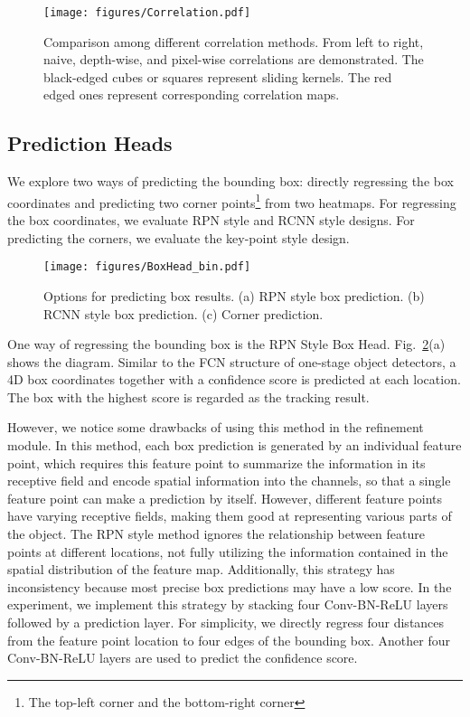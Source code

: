 \documentclass[final]{cvpr}
\begin{document}
\begin{figure}
    \texttt{[image: figures/Correlation.pdf]}
    \caption{Comparison among different correlation methods. From left to right, naive,
depth-wise, and pixel-wise correlations are demonstrated.
The black-edged cubes or squares represent sliding kernels. The
red edged ones represent corresponding correlation maps.} \label{fig-corr-NL}
\end{figure}

\subsection{Prediction Heads}
We explore two ways of predicting the bounding box: directly regressing the box coordinates 
and predicting two corner points\footnote{The top-left corner and the bottom-right corner} 
from two heatmaps. For regressing the box coordinates, we evaluate RPN style and RCNN 
style designs. For predicting the corners, we evaluate the key-point style design.

\begin{figure}[!htb]
\centering
    \texttt{[image: figures/BoxHead\_bin.pdf]}
    \caption{Options for predicting box results. (a) RPN style box prediction. (b) RCNN style box prediction. (c) Corner prediction.} \label{fig:boxhead}
    \vspace{-4mm}
\end{figure}

One way of regressing the bounding box is the RPN Style Box Head. 
Fig.~\ref{fig:boxhead}(a) shows the diagram.
Similar to the FCN structure of one-stage object detectors, a 4D box coordinates 
together with a confidence score is predicted at each location. 
The box with the highest score is regarded as the tracking result. 

However, we notice some drawbacks of using this method in the refinement module.
In this method, each box prediction is generated by an individual feature point, 
which requires this feature point to summarize the information in its receptive field and encode spatial
information into the channels, so that a single feature point can make a prediction by itself.
However, different feature points have varying receptive fields, making them good at representing various parts of the object. 
The RPN style method ignores the relationship between feature points at different locations, not fully utilizing the information
contained in the spatial distribution of the feature map. Additionally, this strategy has inconsistency because most
precise box predictions may have a low score.
In the experiment, we implement this strategy by stacking four Conv-BN-ReLU layers followed by a prediction layer. 
For simplicity, we directly regress four distances from the feature point location to four edges of the bounding box. 
Another four Conv-BN-ReLU layers are used to predict the confidence score. 
\end{document}
